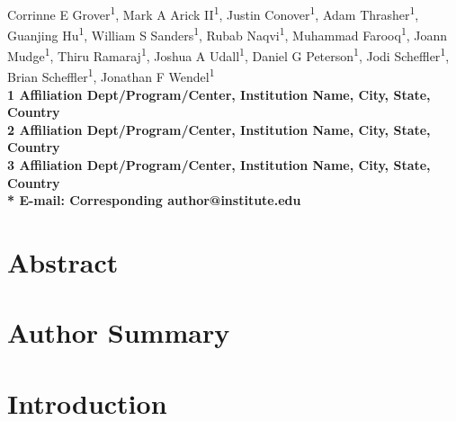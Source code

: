 \documentclass[10pt,letterpaper]{article}
\date{}
\begin{document}
\vspace*{0.35in}

\begin{flushleft}
{\Large
\textbf{}
}
\newline
\\
Corrinne E Grover\textsuperscript{1},
Mark A Arick II\textsuperscript{1},
Justin Conover\textsuperscript{1},
Adam Thrasher\textsuperscript{1},
Guanjing Hu\textsuperscript{1},
William S Sanders\textsuperscript{1},
Rubab Naqvi\textsuperscript{1},
Muhammad Farooq\textsuperscript{1},
Joann Mudge\textsuperscript{1},
Thiru Ramaraj\textsuperscript{1},
Joshua A Udall\textsuperscript{1},
Daniel G Peterson\textsuperscript{1},
Jodi Scheffler\textsuperscript{1},
Brian Scheffler\textsuperscript{1},
Jonathan F Wendel\textsuperscript{1}
\\
\bf{1} Affiliation Dept/Program/Center, Institution Name, City, State, Country
\\
\bf{2} Affiliation Dept/Program/Center, Institution Name, City, State, Country
\\
\bf{3} Affiliation Dept/Program/Center, Institution Name, City, State, Country
\\

% 
%
* E-mail: Corresponding author@institute.edu
\end{flushleft}
\section*{Abstract}


\section*{Author Summary}


\linenumbers

\section*{Introduction}
\end{document}
